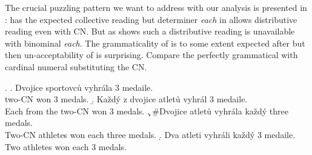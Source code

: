 \documentclass[12pt, a4paper]{scrartcl}
\begin{document}
The crucial puzzling pattern we want to address with our analysis is presented in \Next: \Next[a] has the expected collective reading but determiner \textit{each} in \Next[b] allows distributive reading even with CN. But as \Next[c] shows such a distributive reading is unavailable with binominal \textit{each}. The grammaticality of \Next[b] is to some extent expected after \Last[b] but then un-acceptability of \Next[c] is surprising. Compare the perfectly grammatical \Next[d] with cardinal numeral substituting the CN. 

\ex. \a. Dvojice sportovců vyhrála 3 medaile.\label{ex:dvojice-cum}\\
two-CN won 3 medals.
\b. Každý z dvojice atletů vyhrál 3 medaile.\label{ex:dvojice-det-each}\\
Each from the two-CN won 3 medals.
\c. \#Dvojice atletů vyhrála každý three medals.\label{ex:dvojice-bin-each}\\
Two-CN athletes won each three medals.
\d. Dva atleti vyhráli každý 3 medaile.\label{ex:dva-bin-each}\\
Two athletes won each 3 medals.
\end{document}
